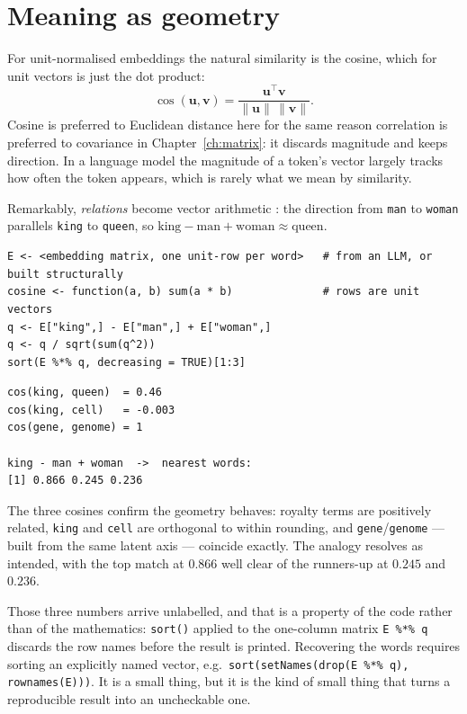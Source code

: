 \documentclass[11pt,oneside]{book}
\newcommand{\code}[1]{\texttt{#1}}
\begin{document}
\section{Meaning as geometry}
For unit-normalised embeddings the natural similarity is the cosine, which for unit
vectors is just the dot product:
\[
  \cos(\mathbf{u},\mathbf{v})=\frac{\mathbf{u}^{\!\top}\mathbf{v}}
       {\lVert\mathbf{u}\rVert\,\lVert\mathbf{v}\rVert}.
\]
Cosine is preferred to Euclidean distance here for the same reason correlation is preferred
to covariance in Chapter~\ref{ch:matrix}: it discards magnitude and keeps direction. In a language model
the magnitude of a token's vector largely tracks how often the token appears, which is
rarely what we mean by similarity.

Remarkably, \emph{relations} become vector arithmetic \cite{Mikolov_2013}: the direction
from \code{man} to \code{woman} parallels \code{king} to \code{queen}, so
$\text{king}-\text{man}+\text{woman}\approx\text{queen}$.

\begin{lstlisting}
E <- <embedding matrix, one unit-row per word>   # from an LLM, or built structurally
cosine <- function(a, b) sum(a * b)              # rows are unit vectors
q <- E["king",] - E["man",] + E["woman",]
q <- q / sqrt(sum(q^2))
sort(E %*% q, decreasing = TRUE)[1:3]
\end{lstlisting}

\begin{lstlisting}[style=rout]
cos(king, queen)  = 0.46
cos(king, cell)   = -0.003
cos(gene, genome) = 1

king - man + woman  ->  nearest words:
[1] 0.866 0.245 0.236
\end{lstlisting}

The three cosines confirm the geometry behaves: royalty terms are positively related,
\code{king} and \code{cell} are orthogonal to within rounding, and \code{gene}/\code{genome}
— built from the same latent axis — coincide exactly. The analogy resolves as intended,
with the top match at $0.866$ well clear of the runners-up at $0.245$ and $0.236$.

\begin{pitfall}
Those three numbers arrive unlabelled, and that is a property of the code rather than of
the mathematics: \code{sort()} applied to the one-column matrix \code{E \%*\% q} discards
the row names before the result is printed. Recovering the words requires sorting an
explicitly named vector, e.g.\ \code{sort(setNames(drop(E \%*\% q), rownames(E)))}. It is a
small thing, but it is the kind of small thing that turns a reproducible result into an
uncheckable one.
\end{pitfall}
\end{document}
